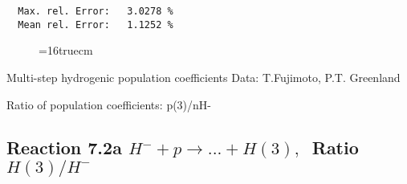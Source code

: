 \documentclass[12pt]{article}
\begin{document}
\begin{small}
\begin{verbatim}
  Max. rel. Error:   3.0278 %
  Mean rel. Error:   1.1252 %

\end{verbatim}\end{small}
\begin{figure} \label{2.2.14e}
\epsfxsize=16truecm
\end{figure}
\newpage

 Multi-step hydrogenic population coefficients
 Data: T.Fujimoto, P.T. Greenland

 Ratio of population coefficients: p(3)/nH-

\subsection{
Reaction 7.2a $ H^- + p \rightarrow ...+ H(3) , \   $
Ratio $H(3)/H^- $
}
\end{document}
